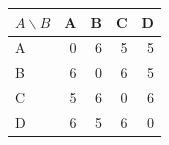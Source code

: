 \begin{tabular}{@{}lrrrr@{}}
\toprule
$A\backslash B$ & A & B & C & D\\
\midrule
A & 0 & 6 & 5 & 5\\
B & 6 & 0 & 6 & 5\\
C & 5 & 6 & 0 & 6\\
D & 6 & 5 & 6 & 0\\
\bottomrule
\end{tabular}
